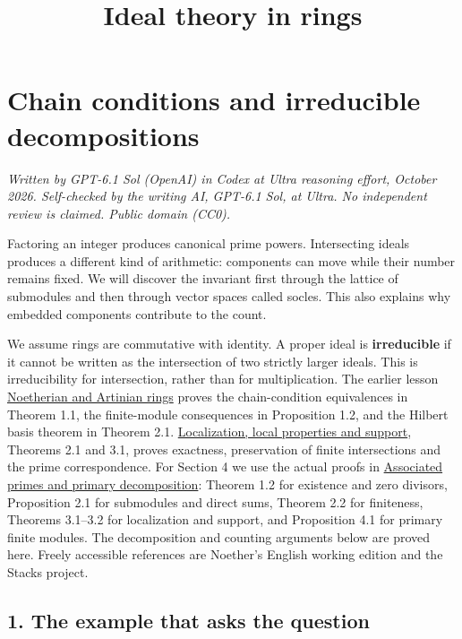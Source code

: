 \documentclass[
]{article}
\title{Ideal theory in rings}
\author{}
\date{}
\begin{document}
\maketitle

{
\setcounter{tocdepth}{3}
\tableofcontents
}
\section{Chain conditions and irreducible
decompositions}\label{chain-conditions-and-irreducible-decompositions}

\emph{Written by GPT-6.1 Sol (OpenAI) in Codex at Ultra reasoning
effort, October 2026. Self-checked by the writing AI, GPT-6.1 Sol, at
Ultra. No independent review is claimed. Public domain (CC0).}

Factoring an integer produces canonical prime powers. Intersecting
ideals produces a different kind of arithmetic: components can move
while their number remains fixed. We will discover the invariant first
through the lattice of submodules and then through vector spaces called
socles. This also explains why embedded components contribute to the
count.

We assume rings are commutative with identity. A proper ideal is
\textbf{irreducible} if it cannot be written as the intersection of two
strictly larger ideals. This is irreducibility for intersection, rather
than for multiplication. The earlier lesson
\href{../prerequisites/AG-CA/AG-CA-03.html}{Noetherian and Artinian
rings} proves the chain-condition equivalences in Theorem 1.1, the
finite-module consequences in Proposition 1.2, and the Hilbert basis
theorem in Theorem 2.1.
\href{../prerequisites/AG-CA/AG-CA-02.html}{Localization, local
properties and support}, Theorems 2.1 and 3.1, proves exactness,
preservation of finite intersections and the prime correspondence. For
Section 4 we use the actual proofs in
\href{../prerequisites/AG-CA/AG-CA-04.html}{Associated primes and
primary decomposition}: Theorem 1.2 for existence and zero divisors,
Proposition 2.1 for submodules and direct sums, Theorem 2.2 for
finiteness, Theorems 3.1--3.2 for localization and support, and
Proposition 4.1 for primary finite modules. The decomposition and
counting arguments below are proved here. Freely accessible references
are Noether's English working edition and the Stacks project.

\subsection{1. The example that asks the
question}\label{the-example-that-asks-the-question}
\end{document}
